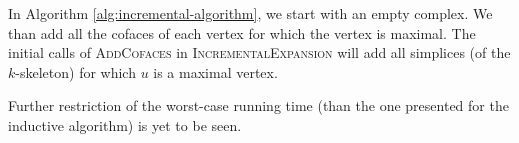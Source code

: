 In Algorithm \ref{alg:incremental-algorithm}, we start with an empty complex. We than add all the cofaces of each vertex for which the vertex is maximal. The initial calls of \textsc{AddCofaces} in \textsc{IncrementalExpansion} will add all simplices (of the $k$-skeleton) for which $u$ is a maximal vertex. 

Further restriction of the worst-case running time (than the one presented for the inductive algorithm) is yet to be seen. 
